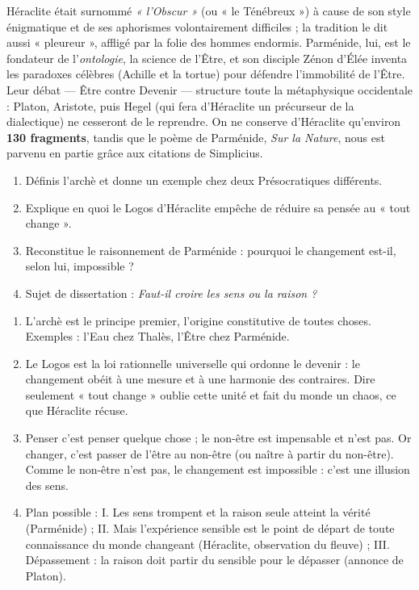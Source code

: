 \documentclass[11pt]{article}
\begin{document}
\begin{savaistu}
Héraclite était surnommé \emph{« l'Obscur »} (ou « le Ténébreux ») à cause de son style énigmatique et de ses aphorismes volontairement difficiles ; la tradition le dit aussi « pleureur », affligé par la folie des hommes endormis. Parménide, lui, est le fondateur de l'\emph{ontologie}, la science de l'Être, et son disciple Zénon d'Élée inventa les paradoxes célèbres (Achille et la tortue) pour défendre l'immobilité de l'Être. Leur débat — Être contre Devenir — structure toute la métaphysique occidentale : Platon, Aristote, puis Hegel (qui fera d'Héraclite un précurseur de la dialectique) ne cesseront de le reprendre. On ne conserve d'Héraclite qu'environ \textbf{130 fragments}, tandis que le poème de Parménide, \emph{Sur la Nature}, nous est parvenu en partie grâce aux citations de Simplicius.
\end{savaistu}

\begin{exercice}
\begin{enumerate}
\item Définis l'archè et donne un exemple chez deux Présocratiques différents.
\item Explique en quoi le Logos d'Héraclite empêche de réduire sa pensée au « tout change ».
\item Reconstitue le raisonnement de Parménide : pourquoi le changement est-il, selon lui, impossible ?
\item Sujet de dissertation : \emph{Faut-il croire les sens ou la raison ?}
\end{enumerate}
\end{exercice}

\begin{corrige}
\begin{enumerate}
\item L'archè est le principe premier, l'origine constitutive de toutes choses. Exemples : l'Eau chez Thalès, l'Être chez Parménide.
\item Le Logos est la loi rationnelle universelle qui ordonne le devenir : le changement obéit à une mesure et à une harmonie des contraires. Dire seulement « tout change » oublie cette unité et fait du monde un chaos, ce que Héraclite récuse.
\item Penser c'est penser quelque chose ; le non-être est impensable et n'est pas. Or changer, c'est passer de l'être au non-être (ou naître à partir du non-être). Comme le non-être n'est pas, le changement est impossible : c'est une illusion des sens.
\item Plan possible : I. Les sens trompent et la raison seule atteint la vérité (Parménide) ; II. Mais l'expérience sensible est le point de départ de toute connaissance du monde changeant (Héraclite, observation du fleuve) ; III. Dépassement : la raison doit partir du sensible pour le dépasser (annonce de Platon).
\end{enumerate}
\end{corrige}
\end{document}
